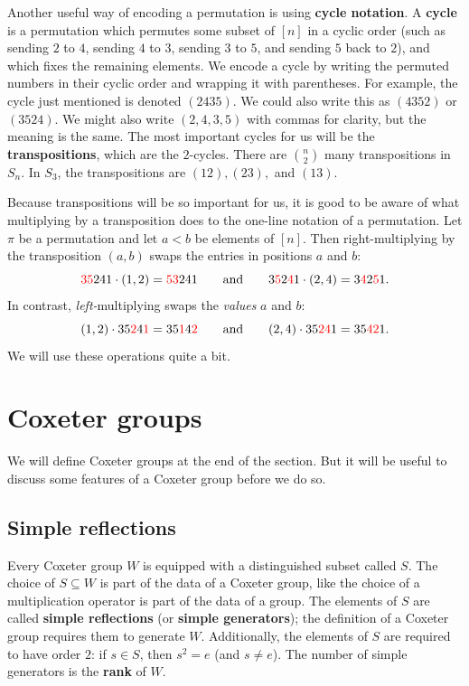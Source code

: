 \documentclass{article}
\numberwithin{equation}{section}
\newcommand{\newword}[1]{\textbf{#1}}
\theoremstyle{remark}
\theoremstyle{definition}
\begin{document}
	Another useful way of encoding a permutation is using \newword{cycle notation}. A \newword{cycle} is a permutation which permutes some subset of $[n]$ in a cyclic order (such as sending $2$ to $4$, sending $4$ to $3$, sending $3$ to $5$, and sending $5$ back to $2$), and which fixes the remaining elements. We encode a cycle by writing the permuted numbers in their cyclic order and wrapping it with parentheses. For example, the cycle just mentioned is denoted $(2435)$. We could also write this as $(4352)$ or $(3524)$. We might also write $(2,4,3,5)$ with commas for clarity, but the meaning is the same. The most important cycles for us will be the \newword{transpositions}, which are the $2$-cycles. There are $\binom{n}{2}$ many transpositions in $S_n$. In $S_3$, the transpositions are $(12), (23),$ and $(13)$.
	
	Because transpositions will be so important for us, it is good to be aware of what multiplying by a transposition does to the one-line notation of a permutation. Let $\pi$ be a permutation and let $a<b$ be elements of $[n]$. Then right-multiplying by the transposition $(a,b)$ swaps the entries in positions $a$ and $b$: 
	\[  \textcolor{red}{35}241\cdot (1,2) = \textcolor{red}{53}241   \qquad\text{and}\qquad 3\textcolor{red}{5}2\textcolor{red}{4}1 \cdot (2,4) =  3\textcolor{red}{4}2\textcolor{red}{5}1. \]
	In contrast,  \emph{left-}multiplying swaps the \emph{values} $a$ and $b$:
	\[  (1,2) \cdot 35\textcolor{red}{2}4\textcolor{red}{1} =  35\textcolor{red}{1}4\textcolor{red}{2} \qquad\text{and}\qquad (2,4)\cdot 35\textcolor{red}{24}1 = 35\textcolor{red}{42}1. \]
	We will use these operations quite a bit.
	
	\section{Coxeter groups}
	
	We will define Coxeter groups at the end of the section. But it will be useful to discuss some features of a Coxeter group before we do so. 
	
	\subsection{Simple reflections}
	Every Coxeter group $W$ is equipped with a distinguished subset called $S$. The choice of $S\subseteq W$ is part of the data of a Coxeter group, like the choice of a multiplication operator is part of the data of a group. The elements of $S$ are called \newword{simple reflections} (or \newword{simple generators}); the definition of a Coxeter group requires them to generate $W$. Additionally, the elements of $S$ are required to have order $2$: if $s\in S$, then $s^2=e$ (and $s\neq e$). The number of simple generators is the \newword{rank} of $W$.
	
\end{document}
